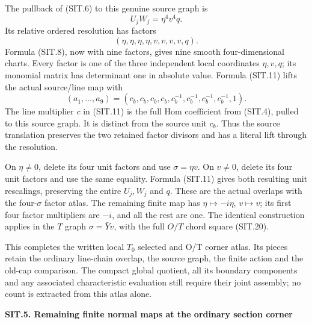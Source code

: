 The pullback of (SIT.6) to this genuine source graph is
\[
 U_jW_j=\eta^4v^4q.
 \tag{SIT.21}
\]
Its relative ordered resolution has factors
\[
 (\eta,\eta,\eta,\eta,v,v,v,v,q).
 \tag{SIT.22}
\]
Formula (SIT.8), now with nine factors, gives nine smooth
four-dimensional charts. Every factor is one of the three
independent local coordinates \(\eta,v,q\); its monomial
matrix has determinant one in absolute value. Formula
(SIT.11) lifts the actual source/line map with
\[
 (a_1,\ldots,a_9)=
 (c_b,c_b,c_b,c_b,c_b^{-1},c_b^{-1},c_b^{-1},c_b^{-1},1).
 \tag{SIT.23}
\]
The line multiplier \(c\) in (SIT.11) is the full Hom
coefficient from (SIT.4), pulled to this source graph.
It is distinct from the source unit \(c_b\).
Thus the source translation preserves the two retained
factor divisors and has a literal lift through the resolution.

On \(\eta\ne0\), delete its four unit factors and use
\(\sigma=\eta v\). On \(v\ne0\), delete its four unit factors
and use the same equality. Formula (SIT.11) gives both
resulting unit rescalings, preserving the entire \(U_j,W_j\)
and \(q\). These are the actual overlaps with the four-\(\sigma\)
factor atlas. The remaining finite map has
\(\eta\mapsto-i\eta\), \(v\mapsto v\); its first four
factor multipliers are \(-i\), and all the rest are one.
The identical construction applies in the \(T\) graph
\(\sigma=\bar Yv\), with the full \(O/T\) chord square (SIT.20).

This completes the written local \(T_0\) selected and O/T corner
atlas. Its pieces retain the ordinary line-chain overlap,
the source graph, the finite action and the old-cap comparison.
The compact global quotient, all its boundary components and
any associated characteristic evaluation still require their
joint assembly; no count is extracted from this atlas alone.

\par

\medskip\noindent\textbf{SIT.5. Remaining finite normal maps at the ordinary section corner}

\par\nobreak

